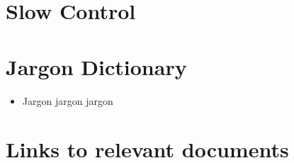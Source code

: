 \documentclass[12pt,preprint]{article}
\begin{document}
\section{Slow Control}

\section{Jargon Dictionary}
\begin{itemize}
\item Jargon jargon jargon 
\end{itemize}

\section{Links to relevant documents}










%

%

\end{document}
